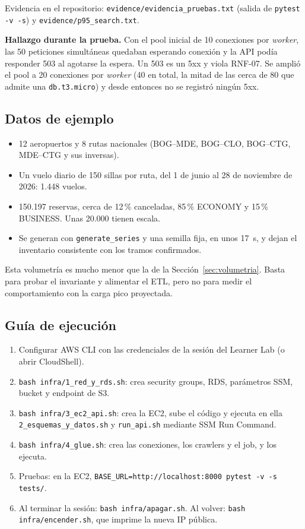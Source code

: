 Evidencia en el repositorio: \texttt{evidence/evidencia\_pruebas.txt} (salida de \texttt{pytest -v -s}) y \texttt{evidence/p95\_search.txt}.

\textbf{Hallazgo durante la prueba.} Con el pool inicial de 10 conexiones por \emph{worker}, las 50 peticiones simultáneas quedaban esperando conexión y la API podía responder 503 al agotarse la espera. Un 503 es un 5xx y viola RNF-07. Se amplió el pool a 20 conexiones por \emph{worker} (40 en total, la mitad de las cerca de 80 que admite una \texttt{db.t3.micro}) y desde entonces no se registró ningún 5xx.

\subsection{Datos de ejemplo}
\begin{itemize}
  \item 12 aeropuertos y 8 rutas nacionales (BOG--MDE, BOG--CLO, BOG--CTG, MDE--CTG y sus inversas).
  \item Un vuelo diario de 150 sillas por ruta, del 1 de junio al 28 de noviembre de 2026: 1.448 vuelos.
  \item 150.197 reservas, cerca de 12\,\% canceladas, 85\,\% ECONOMY y 15\,\% BUSINESS. Unas 20.000 tienen escala.
  \item Se generan con \texttt{generate\_series} y una semilla fija, en unos 17~s, y dejan el inventario consistente con los tramos confirmados.
\end{itemize}

Esta volumetría es mucho menor que la de la Sección~\ref{sec:volumetria}. Basta para probar el invariante y alimentar el ETL, pero no para medir el comportamiento con la carga pico proyectada.

\subsection{Guía de ejecución}
\begin{enumerate}
  \item Configurar AWS CLI con las credenciales de la sesión del Learner Lab (o abrir CloudShell).
  \item \texttt{bash infra/1\_red\_y\_rds.sh}: crea security groups, RDS, parámetros SSM, bucket y endpoint de S3.
  \item \texttt{bash infra/3\_ec2\_api.sh}: crea la EC2, sube el código y ejecuta en ella \texttt{2\_esquemas\_y\_datos.sh} y \texttt{run\_api.sh} mediante SSM Run Command.
  \item \texttt{bash infra/4\_glue.sh}: crea las conexiones, los crawlers y el job, y los ejecuta.
  \item Pruebas: en la EC2, \texttt{BASE\_URL=http://localhost:8000 pytest -v -s tests/}.
  \item Al terminar la sesión: \texttt{bash infra/apagar.sh}. Al volver: \texttt{bash infra/encender.sh}, que imprime la nueva IP pública.
\end{enumerate}

